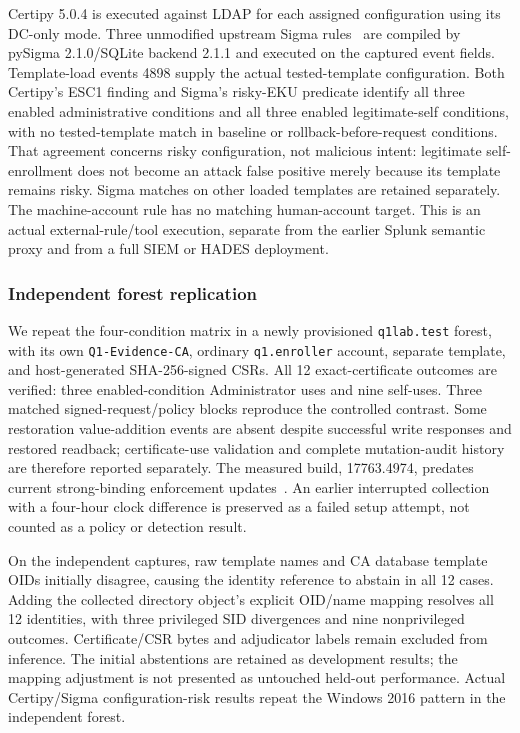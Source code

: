Certipy 5.0.4 is executed against LDAP for each assigned configuration using its DC-only mode. Three unmodified upstream Sigma rules~\cite{sigma2026rules} are compiled by pySigma 2.1.0/SQLite backend 2.1.1 and executed on the captured event fields. Template-load events 4898 supply the actual tested-template configuration. Both Certipy's ESC1 finding and Sigma's risky-EKU predicate identify all three enabled administrative conditions and all three enabled legitimate-self conditions, with no tested-template match in baseline or rollback-before-request conditions. That agreement concerns risky configuration, not malicious intent: legitimate self-enrollment does not become an attack false positive merely because its template remains risky. Sigma matches on other loaded templates are retained separately. The machine-account rule has no matching human-account target. This is an actual external-rule/tool execution, separate from the earlier Splunk semantic proxy and from a full SIEM or HADES deployment.

\subsubsection{Independent forest replication}
We repeat the four-condition matrix in a newly provisioned \texttt{q1lab.test} forest, with its own \texttt{Q1-Evidence-CA}, ordinary \texttt{q1.enroller} account, separate template, and host-generated SHA-256-signed CSRs. All 12 exact-certificate outcomes are verified: three enabled-condition Administrator uses and nine self-uses. Three matched signed-request/policy blocks reproduce the controlled contrast. Some restoration value-addition events are absent despite successful write responses and restored readback; certificate-use validation and complete mutation-audit history are therefore reported separately. The measured build, 17763.4974, predates current strong-binding enforcement updates~\cite{microsoft2025strongbinding}. An earlier interrupted collection with a four-hour clock difference is preserved as a failed setup attempt, not counted as a policy or detection result.

On the independent captures, raw template names and CA database template OIDs initially disagree, causing the identity reference to abstain in all 12 cases. Adding the collected directory object's explicit OID/name mapping resolves all 12 identities, with three privileged SID divergences and nine nonprivileged outcomes. Certificate/CSR bytes and adjudicator labels remain excluded from inference. The initial abstentions are retained as development results; the mapping adjustment is not presented as untouched held-out performance. Actual Certipy/Sigma configuration-risk results repeat the Windows 2016 pattern in the independent forest.

